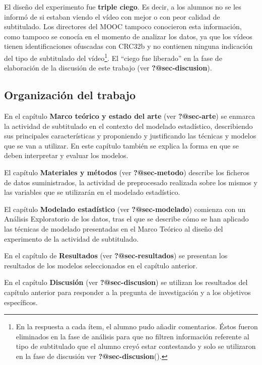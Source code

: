 \documentclass[
  letterpaper,
  DIV=11,
  numbers=noendperiod]{scrartcl}
\begin{document}
El diseño del experimento fue \textbf{triple ciego}. Es decir, a los
alumnos no se les informó de si estaban viendo el vídeo con mejor o con
peor calidad de subtitulado. Los directores del MOOC tampoco conocieron
esta información, como tampoco se conocía en el momento de analizar los
datos, ya que los vídeos tienen identificaciones ofuscadas con CRC32b y
no contienen ninguna indicación del tipo de subtitulado del
vídeo\footnote{En la respuesta a cada ítem, el alumno pudo añadir
  comentarios. Éstos fueron eliminados en la fase de análisis para que
  no filtren información referente al tipo de subtitulado que el alumno
  creyó estar contestando y solo se utilizaron en la fase de discusión
  ver \textbf{?@sec-discusion}().}. El ``ciego fue liberado'' en la fase
de elaboración de la discusión de este trabajo (ver
\textbf{?@sec-discusion}).

\hypertarget{organizaciuxf3n-del-trabajo}{%
\subsection{Organización del
trabajo}\label{organizaciuxf3n-del-trabajo}}

En el capítulo \textbf{Marco teórico y estado del arte} (ver
\textbf{?@sec-arte}) se enmarca la actividad de subtitulado en el
contexto del modelado estadístico, describiendo sus principales
características y proponiendo y justificando las técnicas y modelos que
se van a utilizar. En este capítulo también se explica la forma en que
se deben interpretar y evaluar los modelos.

El capítulo \textbf{Materiales y métodos} (ver \textbf{?@sec-metodo})
describe los ficheros de datos suministrados, la actividad de
preprocesado realizada sobre los mismos y las variables que se
utilizarán en el modelado estadístico.

El capítulo \textbf{Modelado estadístico} (ver \textbf{?@sec-modelado})
comienza con un Análisis Exploratorio de los datos, tras el que se
describe cómo se han aplicado las técnicas de modelado presentadas en el
Marco Teórico al diseño del experimento de la actividad de subtitulado.

En el capítulo de \textbf{Resultados} (ver \textbf{?@sec-resultados}) se
presentan los resultados de los modelos seleccionados en el capítulo
anterior.

En el capítulo \textbf{Discusión} (ver \textbf{?@sec-discusion}) se
utilizan los resultados del capítulo anterior para responder a la
pregunta de investigación y a los objetivos específicos.
\end{document}
